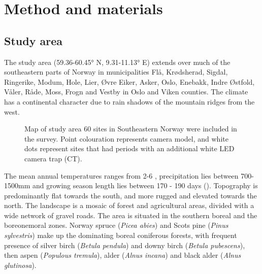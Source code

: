\chapter{Method and materials}


\section{Study area} %


The study area (59.36-60.45° N, 9.31-11.13° E) extends over much of the southeastern parts of Norway in municipalities Flå, Krødsherad, Sigdal, Ringerike, Modum, Hole, Lier, Øvre Eiker, Asker, Oslo, Enebakk, Indre Østfold, Våler, Råde, Moss, Frogn and Vestby in Oslo and Viken counties. 
The climate has a continental character due to rain shadows of the mountain ridges from the west. 


\begin{figure}
\centering
	\label{fig:map}
	\caption[Map of study area]
	{Map of study area %
	60 sites in Southeastern Norway were included in the survey. Point colouration represents camera model, and white dots represent sites that had periods with an additional white LED camera trap (CT).}
\end{figure}

The mean annual temperatures ranges from 2-6 \celsius , precipitation lies between 700-1500mm and growing season length lies between 170 - 190 days (\cite{Moen1999}).
Topography is predominantly flat towards the south, and more rugged and elevated towards the north. The landscape is a mosaic of forest and agricultural areas, divided with a wide network of gravel roads.
The area is situated in the southern boreal and the boreonemoral zones. %
Norway spruce (\textit{Picea abies}) and Scots pine (\textit{Pinus sylvestris}) make up the dominating boreal coniferous forests, with frequent presence of silver birch (\textit{Betula pendula}) and downy birch (\textit{Betula pubescens}), then aspen (\textit{Populous tremula}), alder (\textit{Alnus incana}) and black alder (\textit{Alnus glutinosa}).



